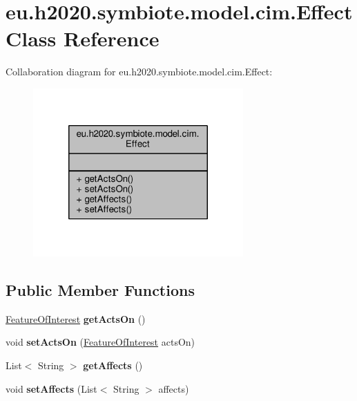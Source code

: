 \hypertarget{classeu_1_1h2020_1_1symbiote_1_1model_1_1cim_1_1Effect}{}\section{eu.\+h2020.\+symbiote.\+model.\+cim.\+Effect Class Reference}
\label{classeu_1_1h2020_1_1symbiote_1_1model_1_1cim_1_1Effect}


Collaboration diagram for eu.\+h2020.\+symbiote.\+model.\+cim.\+Effect\+:
\nopagebreak
\begin{figure}[H]
\begin{center}
\leavevmode
\includegraphics[width=228pt]{classeu_1_1h2020_1_1symbiote_1_1model_1_1cim_1_1Effect__coll__graph}
\end{center}
\end{figure}
\subsection*{Public Member Functions}
\begin{DoxyCompactItemize}
\item 
\mbox{\label{classeu_1_1h2020_1_1symbiote_1_1model_1_1cim_1_1Effect_a75e18dec0830f2147960b4aa51973912}} 
\hyperlink{classeu_1_1h2020_1_1symbiote_1_1model_1_1cim_1_1FeatureOfInterest}{Feature\+Of\+Interest} {\bfseries get\+Acts\+On} ()
\item 
\mbox{\label{classeu_1_1h2020_1_1symbiote_1_1model_1_1cim_1_1Effect_a4571e757811a7f6e69355b594c54c1cd}} 
void {\bfseries set\+Acts\+On} (\hyperlink{classeu_1_1h2020_1_1symbiote_1_1model_1_1cim_1_1FeatureOfInterest}{Feature\+Of\+Interest} acts\+On)
\item 
\mbox{\label{classeu_1_1h2020_1_1symbiote_1_1model_1_1cim_1_1Effect_a91d7c9bfe24273bfa4416a9d1a476342}} 
List$<$ String $>$ {\bfseries get\+Affects} ()
\item 
\mbox{\label{classeu_1_1h2020_1_1symbiote_1_1model_1_1cim_1_1Effect_a62f75cb7d51647a5b03a8b765e8bd47c}} 
void {\bfseries set\+Affects} (List$<$ String $>$ affects)
\end{DoxyCompactItemize}


